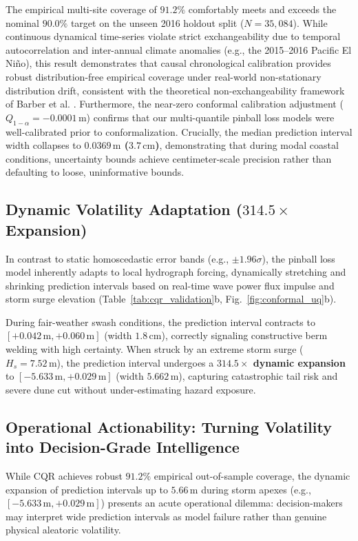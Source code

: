 \documentclass[journal]{IEEEtran}
\begin{document}
The empirical multi-site coverage of \textbf{$91.2\%$} comfortably meets and exceeds the nominal $90.0\%$ target on the unseen 2016 holdout split ($N = 35{,}084$). While continuous dynamical time-series violate strict exchangeability due to temporal autocorrelation and inter-annual climate anomalies (e.g., the 2015--2016 Pacific El Niño), this result demonstrates that causal chronological calibration provides robust distribution-free empirical coverage under real-world non-stationary distribution drift, consistent with the theoretical non-exchangeability framework of Barber et al. \cite{barber2023conformal}. Furthermore, the near-zero conformal calibration adjustment ($Q_{1-\alpha} = -0.0001\,\text{m}$) confirms that our multi-quantile pinball loss models were well-calibrated prior to conformalization. Crucially, the median prediction interval width collapses to \textbf{$0.0369\,\text{m}$ ($3.7\,\text{cm}$)}, demonstrating that during modal coastal conditions, uncertainty bounds achieve centimeter-scale precision rather than defaulting to loose, uninformative bounds.

\subsection{Dynamic Volatility Adaptation \texorpdfstring{($314.5\times$ Expansion)}{(314.5x Expansion)}}
In contrast to static homoscedastic error bands (e.g., $\pm 1.96\sigma$), the pinball loss model inherently adapts to local hydrograph forcing, dynamically stretching and shrinking prediction intervals based on real-time wave power flux impulse and storm surge elevation (Table~\ref{tab:cqr_validation}b, Fig.~\ref{fig:conformal_uq}b).

During fair-weather swash conditions, the prediction interval contracts to $[+0.042\,\text{m}, +0.060\,\text{m}]$ (width $1.8\,\text{cm}$), correctly signaling constructive berm welding with high certainty. When struck by an extreme storm surge ($H_s = 7.52\,\text{m}$), the prediction interval undergoes a \textbf{$314.5\times$ dynamic expansion} to $[-5.633\,\text{m}, +0.029\,\text{m}]$ (width $5.662\,\text{m}$), capturing catastrophic tail risk and severe dune cut without under-estimating hazard exposure.

\subsection{Operational Actionability: Turning Volatility into Decision-Grade Intelligence}
While CQR achieves robust $91.2\%$ empirical out-of-sample coverage, the dynamic expansion of prediction intervals up to $5.66\,\text{m}$ during storm apexes (e.g., $[ -5.633\,\text{m}, +0.029\,\text{m} ]$) presents an acute operational dilemma: decision-makers may interpret wide prediction intervals as model failure rather than genuine physical aleatoric volatility. 
\end{document}
